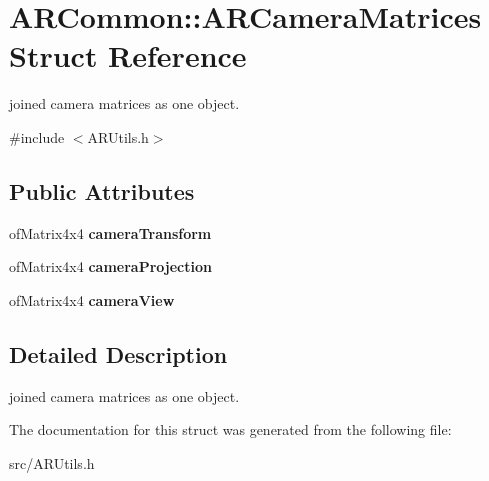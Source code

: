 \hypertarget{struct_a_r_common_1_1_a_r_camera_matrices}{}\section{A\+R\+Common\+:\+:A\+R\+Camera\+Matrices Struct Reference}
\label{struct_a_r_common_1_1_a_r_camera_matrices}


joined camera matrices as one object.  




{\ttfamily \#include $<$A\+R\+Utils.\+h$>$}

\subsection*{Public Attributes}
\begin{DoxyCompactItemize}
\item 
\mbox{\label{struct_a_r_common_1_1_a_r_camera_matrices_a704028e138238522f8e060d5d587b0ef}} 
of\+Matrix4x4 {\bfseries camera\+Transform}
\item 
\mbox{\label{struct_a_r_common_1_1_a_r_camera_matrices_a5d0957360e888d95ae75358416dfe487}} 
of\+Matrix4x4 {\bfseries camera\+Projection}
\item 
\mbox{\label{struct_a_r_common_1_1_a_r_camera_matrices_a0a6b9d23ece063831aac56c704d83d7f}} 
of\+Matrix4x4 {\bfseries camera\+View}
\end{DoxyCompactItemize}


\subsection{Detailed Description}
joined camera matrices as one object. 

The documentation for this struct was generated from the following file\+:\begin{DoxyCompactItemize}
\item 
src/A\+R\+Utils.\+h\end{DoxyCompactItemize}
